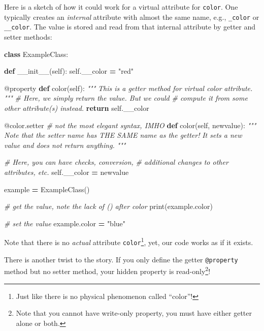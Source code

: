 \documentclass[
]{book}
\newenvironment{Shaded}{\begin{snugshade}}{\end{snugshade}}
\newcommand{\AttributeTok}[1]{\textcolor[rgb]{0.77,0.63,0.00}{#1}}
\newcommand{\BuiltInTok}[1]{#1}
\newcommand{\CommentTok}[1]{\textcolor[rgb]{0.56,0.35,0.01}{\textit{#1}}}
\newcommand{\ControlFlowTok}[1]{\textcolor[rgb]{0.13,0.29,0.53}{\textbf{#1}}}
\newcommand{\FunctionTok}[1]{\textcolor[rgb]{0.00,0.00,0.00}{#1}}
\newcommand{\KeywordTok}[1]{\textcolor[rgb]{0.13,0.29,0.53}{\textbf{#1}}}
\newcommand{\NormalTok}[1]{#1}
\newcommand{\OperatorTok}[1]{\textcolor[rgb]{0.81,0.36,0.00}{\textbf{#1}}}
\newcommand{\StringTok}[1]{\textcolor[rgb]{0.31,0.60,0.02}{#1}}
\newcommand{\VariableTok}[1]{\textcolor[rgb]{0.00,0.00,0.00}{#1}}
\begin{document}
Here is a sketch of how it could work for a virtual attribute for \texttt{color}. One typically creates an \emph{internal} attribute with almost the same name, e.g., \texttt{\_color} or \texttt{\_\_color}. The value is stored and read from that internal attribute by getter and setter methods:

\begin{Shaded}
\begin{Highlighting}[]
\KeywordTok{class}\NormalTok{ ExampleClass:}

  \KeywordTok{def} \FunctionTok{\_\_init\_\_}\NormalTok{(}\VariableTok{self}\NormalTok{):}
    \VariableTok{self}\NormalTok{.\_\_color }\OperatorTok{=} \StringTok{"red"}

  \AttributeTok{@property}
  \KeywordTok{def}\NormalTok{ color(}\VariableTok{self}\NormalTok{):}
    \CommentTok{"""}
\CommentTok{    This is a getter method for virtual color}
\CommentTok{    attribute.}
\CommentTok{    """}
    \CommentTok{\# Here, we simply return the value. But we could }
    \CommentTok{\# compute it from some other attribute(s) instead.}
    \ControlFlowTok{return} \VariableTok{self}\NormalTok{.\_\_color}
    
  \AttributeTok{@color.setter} \CommentTok{\# not the most elegant syntax, IMHO}
  \KeywordTok{def}\NormalTok{ color(}\VariableTok{self}\NormalTok{, newvalue):}
    \CommentTok{"""}
\CommentTok{    Note that the setter name has THE SAME name as the getter!}
\CommentTok{    It sets a new value and does not return anything.}
\CommentTok{    """}
  
    \CommentTok{\# Here, you can have checks, conversion, }
    \CommentTok{\# additional changes to other attributes, etc.}
    \VariableTok{self}\NormalTok{.\_\_color }\OperatorTok{=}\NormalTok{ newvalue}
    
    
\NormalTok{example }\OperatorTok{=}\NormalTok{ ExampleClass()}

\CommentTok{\# get the value, note the lack of () after color}
\BuiltInTok{print}\NormalTok{(example.color)}

\CommentTok{\# set the value}
\NormalTok{example.color }\OperatorTok{=} \StringTok{"blue"}
\end{Highlighting}
\end{Shaded}

Note that there is no \emph{actual} attribute \texttt{color}\footnote{Just like there is no physical phenomenon called ``color''!}, yet, our code works as if it exists.

There is another twist to the story. If you only define the getter \texttt{@property} method but no setter method, your hidden property is read-only\footnote{Note that you cannot have write-only property, you must have either getter alone or both.}!
\end{document}
